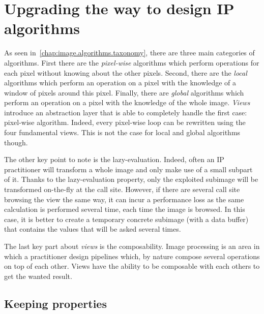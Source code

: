 \section{Upgrading the way to design IP algorithms}

As seen in~\cref{chap:image.algorithms.taxonomy}, there are three main categories of algorithms. First there are the
\emph{pixel-wise} algorithms which perform operations for each pixel without knowing about the other pixels. Second,
there are the \emph{local} algorithms which perform an operation on a pixel with the knowledge of a window of pixels
around this pixel. Finally, there are \emph{global} algorithms which perform an operation on a pixel with the knowledge
of the whole image. \emph{Views} introduce an abstraction layer that is able to completely handle the first case:
pixel-wise algorithm. Indeed, every pixel-wise loop can be rewritten using the four fundamental views. This is not the
case for local and global algorithms though.

The other key point to note is the lazy-evaluation. Indeed, often an IP practitioner will transform a whole image and
only make use of a small subpart of it. Thanks to the lazy-evaluation property, only the exploited subimage will be
transformed on-the-fly at the call site. However, if there are several call site browsing the view the same way, it can
incur a performance loss as the same calculation is performed several time, each time the image is browsed. In this
case, it is better to create a temporary concrete subimage (with a data buffer) that contains the values that will be
asked several times.

The last key part about \emph{views} is the composability. Image processing is an area in which a practitioner design
pipelines which, by nature compose several operations on top of each other. Views have the ability to be composable with
each others to get the wanted result.

\subsection{Keeping properties}

